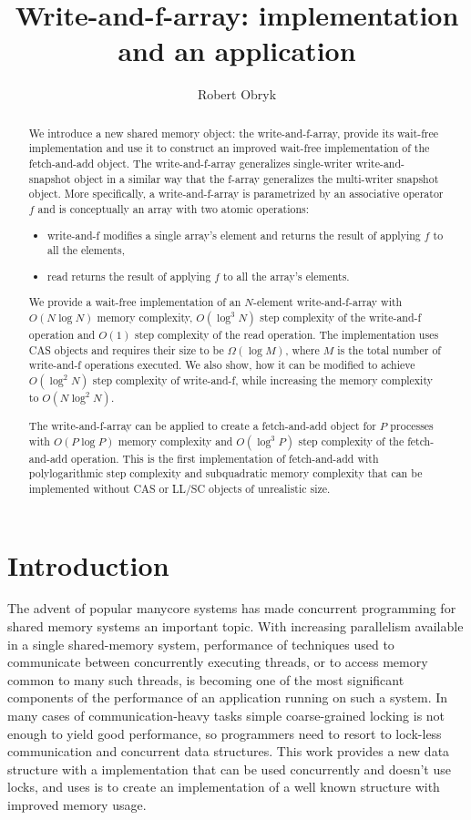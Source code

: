 \documentclass[a4paper,11pt]{article}
\author{Robert Obryk}
\title{Write-and-f-array: implementation and an application}
\date{}
\begin{document}
\maketitle
\begin{abstract}
	We introduce a new shared memory object: the write-and-f-array, provide its wait-free implementation and use it to construct an improved wait-free implementation of the fetch-and-add object. The write-and-f-array generalizes single-writer write-and-snapshot\cite{write-and-snap} object in a similar way that the f-array\cite{f-array} generalizes the multi-writer snapshot object. More specifically, a write-and-f-array is parametrized by an associative operator $f$ and is conceptually an array with two atomic operations:

\begin{itemize}
\item write-and-f modifies a single array's element and returns the result of applying $f$ to all the elements,
\item read returns the result of applying $f$ to all the array's elements.
\end{itemize}

We provide a wait-free implementation of an $N$-element write-and-f-array with $O(N \log N)$ memory complexity, $O(\log^3 N)$ step complexity of the write-and-f operation and $O(1)$ step complexity of the read operation. The implementation uses CAS objects and requires their size to be $\Omega(\log M)$, where $M$ is the total number of write-and-f operations executed. We also show, how it can be modified to achieve $O(\log^2 N)$ step complexity of write-and-f, while increasing the memory complexity to $O(N \log^2 N)$.

The write-and-f-array can be applied to create a fetch-and-add object for $P$ processes with $O(P \log P)$ memory complexity and $O(\log^3 P)$ step complexity of the fetch-and-add operation. This is the first implementation of fetch-and-add with polylogarithmic step complexity and subquadratic memory complexity that can be implemented without CAS or LL/SC objects of unrealistic size\cite{ellen-fai}.
\end{abstract}
\clearpage
\tableofcontents
\clearpage
\section{Introduction}

The advent of popular manycore systems has made concurrent programming for shared memory systems an important
topic. With increasing parallelism available in a single shared-memory system, performance of techniques
used to communicate between concurrently executing threads, or to access memory common to many such threads,
is becoming one of the most significant components of the performance of an application running on such a system.
In many cases of communication-heavy tasks simple coarse-grained locking is not enough to yield good performance,
so programmers need to resort to lock-less communication and concurrent data structures. This work provides a new
data structure with a implementation that can be used concurrently and doesn't use locks, and uses is to create
an implementation of a well known structure with improved memory usage.
\end{document}

